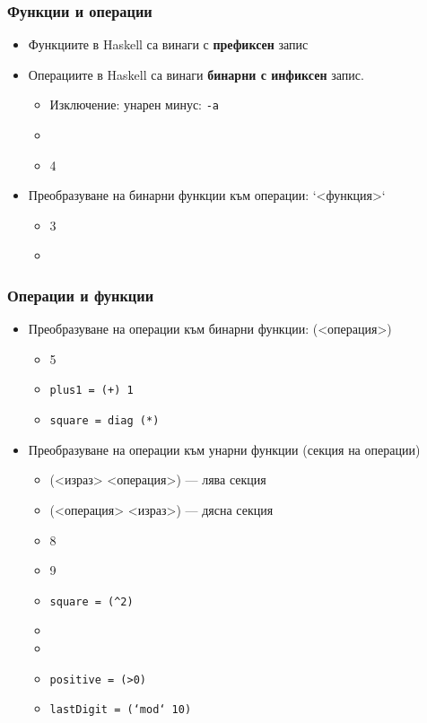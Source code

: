 \documentclass{beamer}
\begin{document}
\begin{frame}
  \frametitle{Функции и операции}
  \begin{itemize}[<+->]
  \item Функциите в Haskell са винаги с \textbf{префиксен} запис
  \item Операциите в Haskell са винаги \textbf{бинарни с инфиксен}
    запис.
    \begin{itemize}
    \item \alert{Изключение:} унарен минус: \tt{-a}
    \item {}
    \item {}4
    \end{itemize}
  \item Преобразуване на бинарни функции към операции: \tta`<функция>\tta`
    \begin{itemize}
    \item {}3
    \item {}
    \end{itemize}
  \end{itemize}
\end{frame}

\begin{frame}
  \frametitle{Операции и функции}
  \begin{itemize}[<+->]
  \item Преобразуване на операции към бинарни функции: \tta(<операция>\tta)
    \begin{itemize}
    \item {}5
    \item \tt{plus1 = (+) 1}
    \item \tt{square = diag (*)}
    \end{itemize}
  \item Преобразуване на операции към унарни функции (секция на операции)
    \begin{itemize}
    \item \tta(<израз> <операция>\tta) --- лява секция
    \item \tta(<операция> <израз>\tta) --- дясна секция
    \item {}8
    \item {}9
    \item \tt{square = (\^{}2)}
    \item {}
    \item {}
    \item \tt{positive = (>0)}
    \item \tt{lastDigit = (`mod` 10)}
    \end{itemize}
  \end{itemize}
\end{frame}
\end{document}
